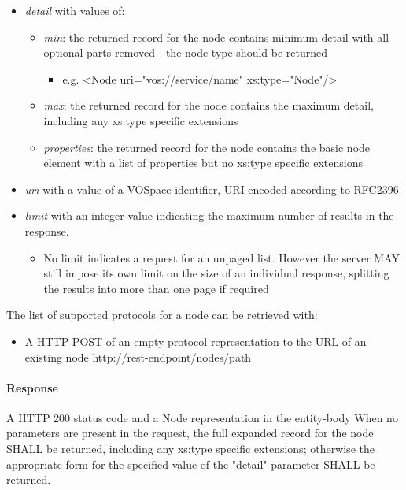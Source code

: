 \documentclass[11pt,a4paper]{ivoa}
\begin{document}
\begin{itemize}
    \item \emph{detail} with values of:
    \begin{itemize}
        \item \emph{min}: the returned record for the node contains minimum detail with all optional parts removed - the node type should be returned
        \begin{itemize}
            \item e.g. <Node uri="vos://service/name" xs:type="Node"/>
        \end{itemize}
        \item \emph{max}: the returned record for the node contains the maximum detail, including any xs:type specific extensions
        \item \emph{properties}: the returned record for the node contains the basic node element with a list of properties but no xs:type specific extensions
    \end{itemize}
    \item \emph{uri} with a value of a VOSpace identifier, URI-encoded according to RFC2396
    \item \emph{limit} with an integer value indicating the maximum number of results in the response.
    \begin{itemize}
        \item No limit indicates a request for an unpaged list. However the server MAY still impose its own limit on the size of an individual response, splitting the results into more than one page if required
     \end{itemize}
\end{itemize}
The list of supported protocols for a node can be retrieved with:

\begin{itemize}
    \item A HTTP POST of an empty protocol representation to the URL of an existing node http://rest-endpoint/nodes/path
\end{itemize}
    
\paragraph{Response}
A HTTP 200 status code and a Node representation in the entity-body
When no parameters are present in the request, the full expanded record for the node SHALL be returned, including any xs:type specific extensions; otherwise the appropriate form for the specified value of the "detail" parameter SHALL be returned.
\end{document}
